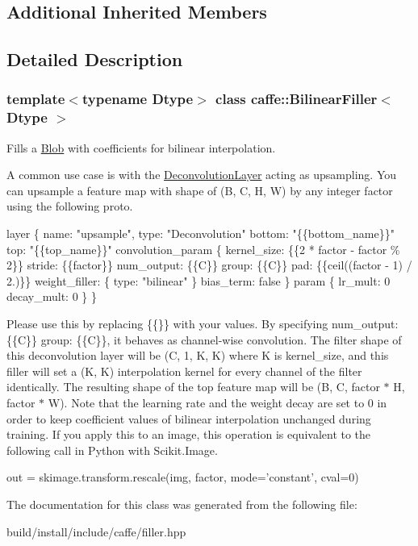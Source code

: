 \subsection*{Additional Inherited Members}


\subsection{Detailed Description}
\subsubsection*{template$<$typename Dtype$>$\newline
class caffe\+::\+Bilinear\+Filler$<$ Dtype $>$}

Fills a \mbox{\hyperlink{classcaffe_1_1_blob}{Blob}} with coefficients for bilinear interpolation. 

A common use case is with the \mbox{\hyperlink{classcaffe_1_1_deconvolution_layer}{Deconvolution\+Layer}} acting as upsampling. You can upsample a feature map with shape of (B, C, H, W) by any integer factor using the following proto. 
\begin{DoxyCode}
layer \{
  name: \textcolor{stringliteral}{"upsample"}, type: \textcolor{stringliteral}{"Deconvolution"}
  bottom: \textcolor{stringliteral}{"\{\{bottom\_name\}\}"} top: \textcolor{stringliteral}{"\{\{top\_name\}\}"}
  convolution\_param \{
    kernel\_size: \{\{2 * factor - factor \% 2\}\} stride: \{\{factor\}\}
    num\_output: \{\{C\}\} group: \{\{C\}\}
    pad: \{\{ceil((factor - 1) / 2.)\}\}
    weight\_filler: \{ type: \textcolor{stringliteral}{"bilinear"} \} bias\_term: \textcolor{keyword}{false}
  \}
  param \{ lr\_mult: 0 decay\_mult: 0 \}
\}
\end{DoxyCode}
 Please use this by replacing {\ttfamily \{\{\}\}} with your values. By specifying {\ttfamily num\+\_\+output\+: \{\{C\}\} group\+: \{\{C\}\}}, it behaves as channel-\/wise convolution. The filter shape of this deconvolution layer will be (C, 1, K, K) where K is {\ttfamily kernel\+\_\+size}, and this filler will set a (K, K) interpolation kernel for every channel of the filter identically. The resulting shape of the top feature map will be (B, C, factor $\ast$ H, factor $\ast$ W). Note that the learning rate and the weight decay are set to 0 in order to keep coefficient values of bilinear interpolation unchanged during training. If you apply this to an image, this operation is equivalent to the following call in Python with Scikit.\+Image. 
\begin{DoxyCode}
out = skimage.transform.rescale(img, factor, mode=\textcolor{stringliteral}{'constant'}, cval=0)
\end{DoxyCode}
 

The documentation for this class was generated from the following file\+:\begin{DoxyCompactItemize}
\item 
build/install/include/caffe/filler.\+hpp\end{DoxyCompactItemize}
